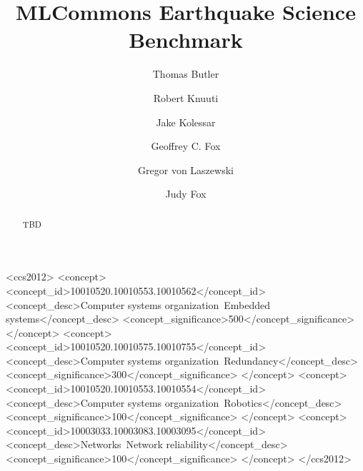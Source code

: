 \documentclass[sigplan,screen]{format/acmart}
\begin{document}
\title{MLCommons Earthquake Science Benchmark}

\author{Thomas Butler}

\author{Robert Knuuti}

\author{Jake Kolessar}

\author{Geoffrey C. Fox}

\author{Gregor von Laszewski}

\author{Judy Fox}

\renewcommand{\shortauthors}{Butler, Knuuti, Kolesar, Fox, von Laszewski}

\begin{abstract}
TBD
\end{abstract}

\begin{CCSXML}
<ccs2012>
 <concept>
  <concept_id>10010520.10010553.10010562</concept_id>
  <concept_desc>Computer systems organization~Embedded systems</concept_desc>
  <concept_significance>500</concept_significance>
 </concept>
 <concept>
  <concept_id>10010520.10010575.10010755</concept_id>
  <concept_desc>Computer systems organization~Redundancy</concept_desc>
  <concept_significance>300</concept_significance>
 </concept>
 <concept>
  <concept_id>10010520.10010553.10010554</concept_id>
  <concept_desc>Computer systems organization~Robotics</concept_desc>
  <concept_significance>100</concept_significance>
 </concept>
 <concept>
  <concept_id>10003033.10003083.10003095</concept_id>
  <concept_desc>Networks~Network reliability</concept_desc>
  <concept_significance>100</concept_significance>
 </concept>
</ccs2012>
\end{CCSXML}
\end{document}
